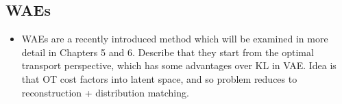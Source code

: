 \subsection{WAEs}

\begin{itemize}
\item WAEs are a recently introduced method which will be examined in more detail in Chapters 5 and 6. Describe that they start from the optimal transport perspective, which has some advantages over KL in VAE. Idea is that OT cost factors into latent space, and so problem reduces to reconstruction + distribution matching. 
\end{itemize}





